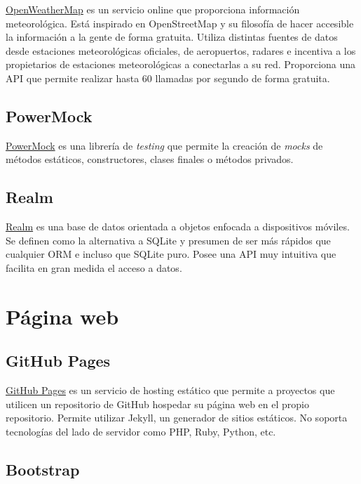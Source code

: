 \href{http://openweathermap.org/}{OpenWeatherMap} es un servicio online
que proporciona información meteorológica. Está inspirado en
OpenStreetMap y su filosofía de hacer accesible la información a la
gente de forma gratuita. Utiliza distintas fuentes de datos desde
estaciones meteorológicas oficiales, de aeropuertos, radares e incentiva
a los propietarios de estaciones meteorológicas a conectarlas a su red.
Proporciona una API que permite realizar hasta 60 llamadas por segundo
de forma gratuita.

\subsection{PowerMock}\label{powermock}

\href{https://github.com/powermock/powermock}{PowerMock} es una librería
de \emph{testing} que permite la creación de \emph{mocks} de métodos
estáticos, constructores, clases finales o métodos privados.

\subsection{Realm}\label{realm}

\href{https://realm.io/products/realm-mobile-database/}{Realm} es una
base de datos orientada a objetos enfocada a dispositivos móviles. Se
definen como la alternativa a SQLite y presumen de ser más rápidos que
cualquier ORM e incluso que SQLite puro. Posee una API muy intuitiva que
facilita en gran medida el acceso a datos.

\section{Página web}\label{pagina-web}

\subsection{GitHub Pages}\label{github-pages}

\href{https://pages.github.com/}{GitHub Pages} es un servicio de hosting
estático que permite a proyectos que utilicen un repositorio de GitHub 
hospedar su página web en el propio repositorio. Permite utilizar Jekyll, un generador de sitios
estáticos. No soporta tecnologías del lado de servidor como PHP, Ruby,
Python, etc.

\subsection{Bootstrap}\label{bootstrap}

